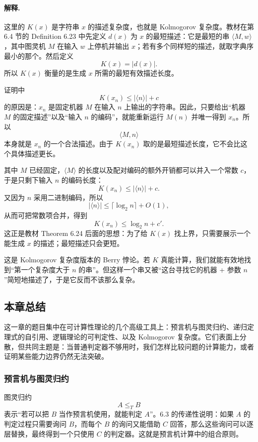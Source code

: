 \begin{answerred}
\begin{answernote}
\paragraph{解释.}
这里的 $K(x)$ 是字符串 $x$ 的描述复杂度，也就是 Kolmogorov 复杂度。教材在第 6.4 节的 Definition 6.23 中先定义 $d(x)$ 为 $x$ 的最短描述：它是最短的串 $\langle M,w\rangle$，其中图灵机 $M$ 在输入 $w$ 上停机并输出 $x$；若有多个同样短的描述，就取字典序最小的那个。然后定义
\[
K(x)=|d(x)|.
\]
所以 $K(x)$ 衡量的是生成 $x$ 所需的最短有效描述长度。

\medskip
证明中
\[
K(x_n)\le |\langle n\rangle|+c
\]
的原因是：$x_n$ 是固定机器 $M$ 在输入 $n$ 上输出的字符串。因此，只要给出“机器 $M$ 的固定描述”以及“输入 $n$ 的编码”，就能重新运行 $M(n)$ 并唯一得到 $x_n$。所以
\[
\langle M,n\rangle
\]
本身就是 $x_n$ 的一个合法描述。由于 $K(x_n)$ 取的是最短描述长度，它不会比这个具体描述更长。

其中 $M$ 已经固定，$\langle M\rangle$ 的长度以及配对编码的额外开销都可以并入一个常数 $c$，于是只剩下输入 $n$ 的编码长度：
\[
K(x_n)\le |\langle n\rangle|+c.
\]
又因为 $n$ 采用二进制编码，所以
\[
|\langle n\rangle|\le \lceil \log_2 n\rceil+O(1),
\]
从而可把常数项合并，得到
\[
K(x_n)\le \log_2 n+c'.
\]
这正是教材 Theorem 6.24 后面的思想：为了给 $K(x)$ 找上界，只需要展示一个能生成 $x$ 的描述；最短描述只会更短。

\medskip
这是 Kolmogorov 复杂度版本的 Berry 悖论。若 $K$ 真能计算，我们就能有效地找到“第一个复杂度大于 $n$ 的串”。但这样一个串又被“这台寻找它的机器 + 参数 $n$”简短地描述了，于是它反而不该那么复杂。
\end{answernote}
\end{answerred}

\subsection*{本章总结}

这一章的题目集中在可计算性理论的几个高级工具上：预言机与图灵归约、递归定理式的自引用、逻辑理论的可判定性、以及 Kolmogorov 复杂度。它们表面上分散，但共同主题是：当普通判定器不够用时，我们怎样比较问题的计算能力，或者证明某些能力边界仍然无法突破。

\subsubsection*{预言机与图灵归约}

图灵归约
\[
A\le_T B
\]
表示“若可以把 $B$ 当作预言机使用，就能判定 $A$”。6.3 的传递性说明：如果 $A$ 的判定过程只需要询问 $B$，而每个 $B$ 的询问又能借助 $C$ 回答，那么这些询问可以逐层替换，最终得到一个只使用 $C$ 的判定器。这就是预言机计算中的组合原则。

